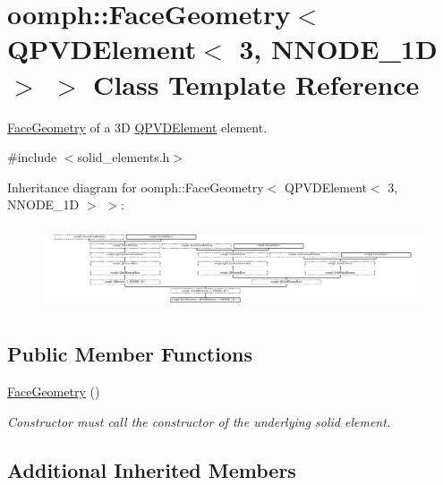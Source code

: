 \hypertarget{classoomph_1_1FaceGeometry_3_01QPVDElement_3_013_00_01NNODE__1D_01_4_01_4}{}\section{oomph\+:\+:Face\+Geometry$<$ Q\+P\+V\+D\+Element$<$ 3, N\+N\+O\+D\+E\+\_\+1D $>$ $>$ Class Template Reference}
\label{classoomph_1_1FaceGeometry_3_01QPVDElement_3_013_00_01NNODE__1D_01_4_01_4}


\hyperlink{classoomph_1_1FaceGeometry}{Face\+Geometry} of a 3D \hyperlink{classoomph_1_1QPVDElement}{Q\+P\+V\+D\+Element} element.  




{\ttfamily \#include $<$solid\+\_\+elements.\+h$>$}

Inheritance diagram for oomph\+:\+:Face\+Geometry$<$ Q\+P\+V\+D\+Element$<$ 3, N\+N\+O\+D\+E\+\_\+1D $>$ $>$\+:\begin{figure}[H]
\begin{center}
\leavevmode
\includegraphics[height=2.502793cm]{classoomph_1_1FaceGeometry_3_01QPVDElement_3_013_00_01NNODE__1D_01_4_01_4}
\end{center}
\end{figure}
\subsection*{Public Member Functions}
\begin{DoxyCompactItemize}
\item 
\hyperlink{classoomph_1_1FaceGeometry_3_01QPVDElement_3_013_00_01NNODE__1D_01_4_01_4_a8b150ea61a2e17414615e693e1dc8bbc}{Face\+Geometry} ()
\begin{DoxyCompactList}\small\item\em Constructor must call the constructor of the underlying solid element. \end{DoxyCompactList}\end{DoxyCompactItemize}
\subsection*{Additional Inherited Members}


